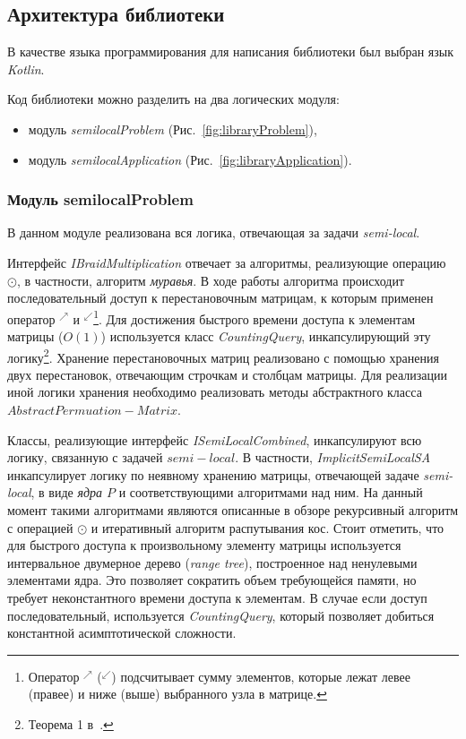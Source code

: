 
\subsection{Архитектура библиотеки}
В качестве языка программирования для написания библиотеки был выбран язык \emph{Kotlin}.

Код библиотеки можно  разделить на два логических модуля:
\begin{itemize}
    \item модуль \emph{semilocalProblem}  (Рис.~\ref{fig:libraryProblem}),
    \item модуль \emph{semilocalApplication} (Рис.~\ref{fig:libraryApplication}).
\end{itemize}


\subsubsection{Модуль semilocalProblem}
В данном модуле реализована вся логика, отвечающая за задачи \emph{semi-local}.

Интерфейс \emph{IBraidMultiplication} отвечает за алгоритмы, реализующие операцию $\odot$, в частности, алгоритм \emph{муравья}.
В ходе работы алгоритма происходит последовательный доступ к перестановочным матрицам, к которым применен оператор $^{\nearrow}$ и $^{\swarrow}$\footnote{Оператор $^{\nearrow}$ ($^{\swarrow}$)  подсчитывает сумму элементов, которые лежат левее (правее) и ниже (выше) выбранного узла в матрице.}.
Для достижения быстрого времени доступа к элементам  матрицы ($O(1)$) используется
класс \emph{CountingQuery}, инкапсулирующий эту логику\footnote{Теорема 1 в~\cite{tiskin2015fast}.}.
% 
Хранение перестановочных матриц реализовано с помощью хранения двух перестановок, отвечающим строчкам и столбцам матрицы.
Для реализации иной логики хранения необходимо реализовать методы абстрактного класса $AbstractPermuation-Matrix$.

Классы, реализующие интерфейс \emph{ISemiLocalCombined}, инкапсулируют всю логику, связанную с задачей $semi-local$.
В частности, \emph{ImplicitSemiLocalSA} инкапсулирует логику по неявному хранению матрицы, отвечающей задаче \emph{semi-local}, в виде \emph{ядра $P$} и соответствующими алгоритмами над ним.
На данный момент такими алгоритмами являются описанные в обзоре рекурсивный алгоритм с операцией $\odot$ и итеративный алгоритм распутывания кос.
Стоит отметить, что для быстрого доступа к произвольному элементу матрицы  используется интервальное двумерное дерево (\emph{range tree}), построенное над ненулевыми элементами ядра.
Это позволяет сократить объем требующейся памяти, но требует неконстантного времени доступа к элементам.
В случае если доступ последовательный, используется  \emph{CountingQuery}, который позволяет добиться константной асимптотической сложности.

